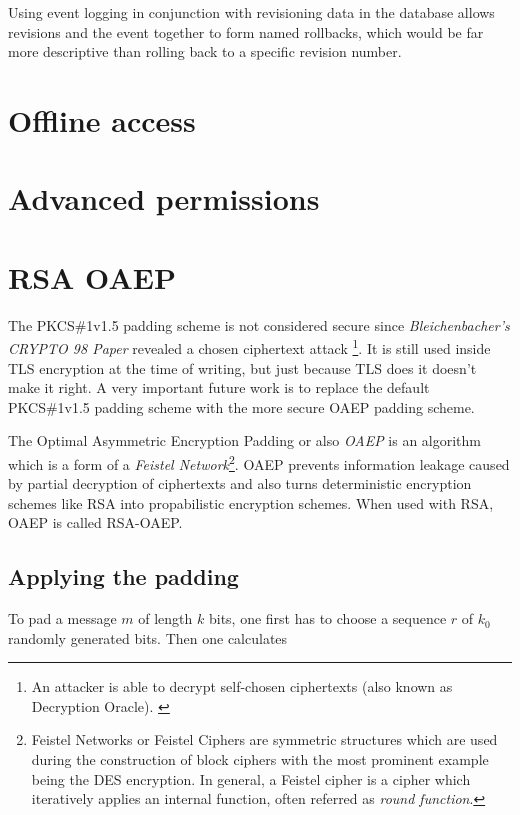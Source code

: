 Using event logging in conjunction with revisioning data in the database allows
revisions and the event together to form named rollbacks, which would be far
more descriptive than rolling back to a specific revision number.

\section{Offline access}
\section{Advanced permissions}

\section{RSA OAEP}

The PKCS\#1v1.5 padding scheme is not considered secure since
\textit{Bleichenbacher's CRYPTO 98 Paper} \cite{rsabulletin}
revealed a chosen ciphertext attack \footnote{
  An attacker is able to decrypt self-chosen ciphertexts (also
  known as Decryption Oracle). \cite[p. 70]{baumann2014kryptographische}
}.
It is still used inside TLS encryption at the time of writing,
but just because TLS does it doesn't make it right. A very important
future work is to replace the default PKCS\#1v1.5 padding scheme with
the more secure OAEP padding scheme.

The Optimal Asymmetric Encryption Padding or also \textit{OAEP}
is an algorithm which is a form of a \textit{Feistel Network}\footnote{
  Feistel Networks or Feistel Ciphers are symmetric structures which are used
  during the construction of block ciphers with the most prominent example
  being the DES encryption. In general, a Feistel cipher is a cipher which
  iteratively applies an internal function, often referred as \textit{round function}.
}. OAEP prevents information leakage caused by partial decryption of 
ciphertexts and also turns deterministic encryption schemes like RSA into
propabilistic encryption schemes. When used with RSA, OAEP is called
RSA-OAEP.

\subsection{Applying the padding}

To pad a message $m$ of length $k$ bits, one first has to choose a sequence
$r$ of $k_0$ randomly generated bits. Then one calculates

